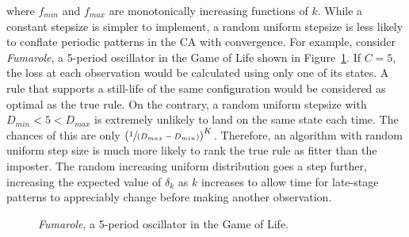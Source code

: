 where $f_{min}$ and $f_{max}$ are monotonically increasing functions of $k$. While a constant stepsize is simpler to implement, a random uniform stepsize is less likely to conflate periodic patterns in the CA with convergence. For example, consider \textit{Fumarole}, a 5-period oscillator in the Game of Life shown in Figure~\ref{fig:fumarole}. If $C=5$, the loss at each observation would be calculated using only one of its states. A rule that supports a still-life of the same configuration would be considered as optimal as the true rule. On the contrary, a random uniform stepsize with $D_{min} < 5 < D_{max}$ is extremely unlikely to land on the same state each time. The chances of this are only $\left(\sfrac{1}{(D_{max} - D_{min})}\right)^K$. Therefore, an algorithm with random uniform step size is much more likely to rank the true rule as fitter than the imposter. The random increasing uniform distribution goes a step further, increasing the expected value of $\delta_k$ as $k$ increases to allow time for late-stage patterns to appreciably change before making another observation.\\

\begin{figure}[!h]
\centering
            \hfill
            \hfill
            \hfill
            \hfill
            \hfill
            \caption{\textit{Fumarole}, a 5-period oscillator in the Game of Life. \cite{fumarole}}
\label{fig:fumarole}
\end{figure}

